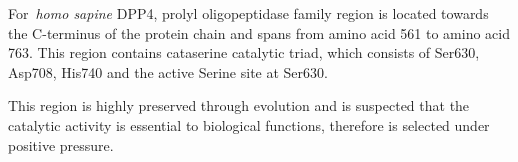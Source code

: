 For~\textit{homo sapine} DPP4, prolyl oligopeptidase family region is located towards the C-terminus of the protein chain and spans from amino acid 561 to amino acid 763. This region contains cataserine catalytic triad, which consists of Ser630, Asp708, His740 and the active Serine site at Ser630. \par
This region is highly preserved through evolution and is suspected that the catalytic activity is essential to biological functions, therefore is selected under positive pressure. 